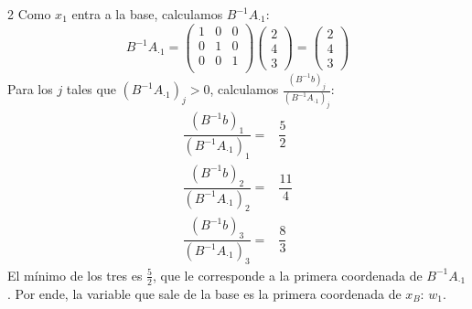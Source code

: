 \documentclass{article}
\newcommand{\binv}{B^{-1}}
\begin{document}
\begin{multicols}{2}
        Como $x_1$ entra a la base, calculamos $\binv A_{\boldsymbol{\cdot} 1}$:
        \[
            \binv A_{\boldsymbol{\cdot} 1} =
            \begin{pmatrix}
                1 & 0 & 0 \\
                0 & 1 & 0 \\
                0 & 0 & 1 \\
            \end{pmatrix}
            \begin{pmatrix}
                2 \\ 4 \\ 3
            \end{pmatrix} =
            \begin{pmatrix}
                2 \\ 4 \\ 3
            \end{pmatrix}
        \]
        Para los $j$ tales que $(\binv A_{\boldsymbol{\cdot} 1})_j>0$, calculamos $\frac{(\binv b)_j}{(\binv A_{\boldsymbol{\cdot} 1})_j}$:
        \[
            \begin{array}{rl}
                \dfrac{(\binv b)_1}{(\binv A_{\boldsymbol{\cdot} 1})_1} = & \dfrac{5}{2} \\
                \dfrac{(\binv b)_2}{(\binv A_{\boldsymbol{\cdot} 1})_2} = & \dfrac{11}{4}\\
                \dfrac{(\binv b)_3}{(\binv A_{\boldsymbol{\cdot} 1})_3} = & \dfrac{8}{3}
            \end{array}
        \]
        El mínimo de los tres es $\frac{5}{2}$, que le corresponde a la primera coordenada de $\binv A_{\boldsymbol{\cdot} 1}$.
        Por ende, la variable que sale de la base es la primera coordenada de $x_B$: $w_1$.
    \end{multicols}
\end{document}
